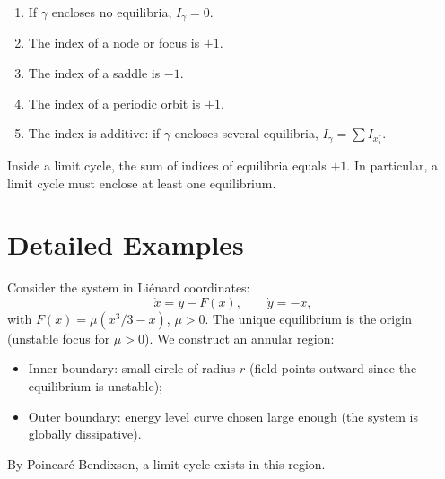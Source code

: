 \begin{theorem}
\begin{enumerate}
    \item If $\gamma$ encloses no equilibria, $I_\gamma = 0$.
    \item The index of a node or focus is $+1$.
    \item The index of a saddle is $-1$.
    \item The index of a periodic orbit is $+1$.
    \item The index is additive: if $\gamma$ encloses several equilibria,
    $I_\gamma = \sum I_{x_i^*}$.
\end{enumerate}
\end{theorem}

\begin{corollary}
Inside a limit cycle, the sum of indices of equilibria equals $+1$. In
particular, a limit cycle must enclose at least one equilibrium.
\end{corollary}

\section{Detailed Examples}

\begin{example}
Consider the system in Li\'enard coordinates:
\[
    \dot{x} = y - F(x), \qquad \dot{y} = -x,
\]
with $F(x) = \mu(x^3/3 - x)$, $\mu > 0$. The unique equilibrium is the
origin (unstable focus for $\mu > 0$). We construct an annular region:
\begin{itemize}
    \item Inner boundary: small circle of radius $r$ (field points outward
    since the equilibrium is unstable);
    \item Outer boundary: energy level curve chosen large enough (the system
    is globally dissipative).
\end{itemize}
By Poincar\'e-Bendixson, a limit cycle exists in this region.
\end{example}

